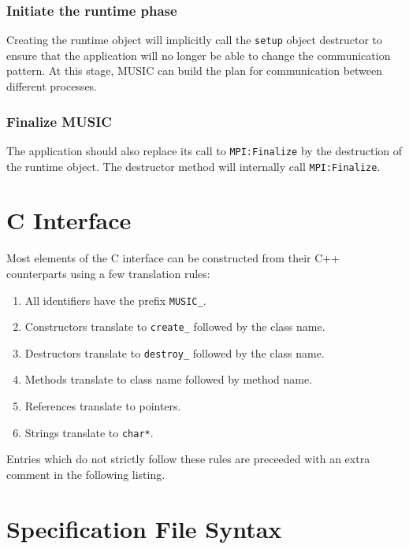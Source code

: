 \documentclass[a4paper]{report}
\begin{document}
\subsection{Initiate the runtime phase}

Creating the runtime object will implicitly call the \lstinline|setup|
object destructor to ensure that the application will no longer be
able to change the communication pattern.  At this stage, MUSIC can
build the plan for communication between different processes.

\subsection{Finalize MUSIC}

The application should also replace its call to
\lstinline|MPI:Finalize| by the destruction of the runtime object.
The destructor method will internally call \lstinline|MPI:Finalize|.




\appendix

\chapter{C Interface}
\label{app:cint}

Most elements of the C interface can be constructed from their C++
counterparts using a few translation rules:

\begin{enumerate}
\item All identifiers have the prefix \lstinline|MUSIC_|.
\item Constructors translate to \lstinline|create_| followed by the
  class name.
\item Destructors translate to \lstinline|destroy_| followed by the
  class name.
\item Methods translate to class name followed by method name.
\item References translate to pointers.
\item Strings translate to \lstinline|char*|.
\end{enumerate}

Entries which do not strictly follow these rules are preceeded with an
extra comment in the following listing.



\chapter{Specification File Syntax}
\label{sec:specsyntax}
\end{document}
